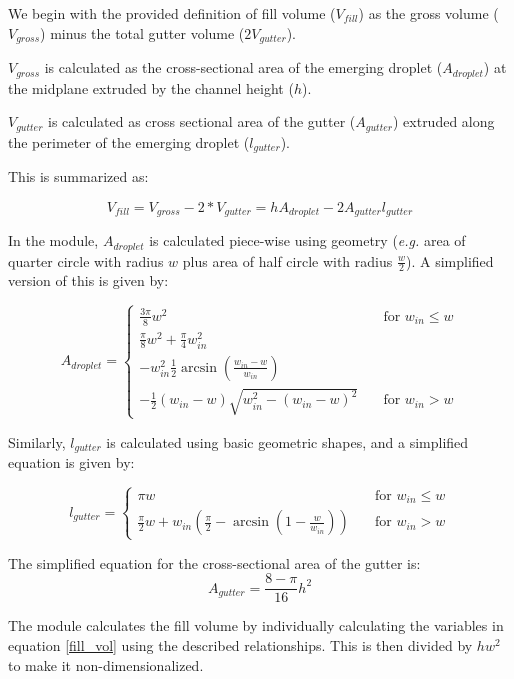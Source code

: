 We begin with the provided definition of fill volume ($V_{fill}$) as the gross volume
($V_{gross}$) minus the total gutter volume ($2V_{gutter}$).

$V_{gross}$ is calculated as the cross-sectional area of the emerging droplet ($A_{droplet}$)
at the midplane extruded by the channel height ($h$).

$V_{gutter}$ is calculated as cross sectional area of the gutter ($A_{gutter}$) extruded along
the perimeter of the emerging droplet ($l_{gutter}$).

This is summarized as:

\begin{equation}
  V_{fill} = V_{gross} - 2*V_{gutter} = hA_{droplet} - 2A_{gutter}l_{gutter} \label{fill_vol}
\end{equation}

\noindent In the module, $A_{droplet}$ is calculated piece-wise using geometry (\emph{e.g.} area of quarter circle with 
radius $w$ plus area of half circle with radius $\frac{w}{2}$). A simplified version of this is given by:

$$
A_{droplet} = 
    \begin{cases}
      \frac{3\pi}{8}w^2 & \quad \text{for } w_{in} \leq w\\
      \frac{\pi}{8}w^2 + \frac{\pi}{4}w_{in}^2 \\
      - w_{in}^2\frac{1}{2}\arcsin{\left(\frac{w_{in}-w}{w_{in}}\right)} \\
      - \frac{1}{2}\left(w_{in}-w\right)\sqrt{w_{in}^2 - \left(w_{in}-w\right)^2} & \quad \text{for } w_{in} > w
    \end{cases}
$$

\noindent Similarly, $l_{gutter}$ is calculated using basic geometric shapes, and a simplified
equation is given by:

$$
l_{gutter} = 
    \begin{cases}
      {\pi}w & \quad \text{for } w_{in} \leq w\\
      \frac{\pi}{2}w+w_{in}\left(\frac{\pi}{2}-\arcsin\left(1-\frac{w}{w_{in}}\right)\right) & \quad \text{for } w_{in} > w
    \end{cases}
$$


\noindent The simplified equation for the cross-sectional area of the gutter is:
$$A_{gutter} = \frac{8-\pi}{16}h^2$$

\noindent The module calculates the fill volume by individually calculating the variables in equation
\eqref{fill_vol} using the described relationships.
This is then divided by $hw^2$ to make it non-dimensionalized.

